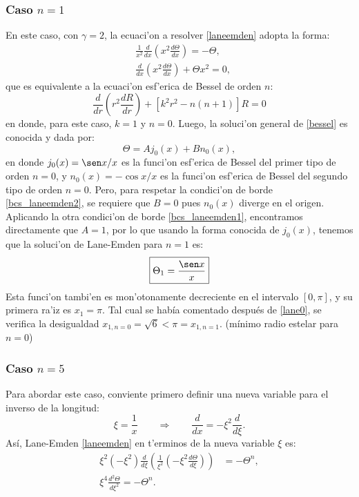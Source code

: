 \subsubsection{Caso \texorpdfstring{$n=1$}{n1}}
En este caso, con $\gamma=2$, la ecuaci'on a resolver \eqref{laneemden} adopta la forma:
\begin{align}
&\frac{1}{x^2}\frac{d}{dx}\left(x^2\frac{d\Theta}{dx}\right)=-\Theta,\\
&\frac{d}{dx}\left(x^2\frac{d\Theta}{dx}\right)+\Theta x^2=0,\label{bessel}
\end{align}
que es equivalente a la ecuaci'on esf'erica de Bessel de orden $n$:
\begin{equation}
 \frac{d}{dr}\left(r^2\frac{dR}{dr}\right)+\left[k^2 r^2-n(n+1)\right]R=0
\end{equation}
en donde, para este caso, $k=1$ y $n=0$. Luego, la soluci'on general de \eqref{bessel} es conocida y dada por:
\begin{equation}
 \Theta=Aj_0(x)+Bn_0(x),
\end{equation}
en donde $j_0(x)=\sen x/x$ es la funci'on esf'erica de Bessel del primer tipo de orden $n=0$, y $n_0(x)=-\cos x/x$ es la funci'on esf'erica de Bessel del segundo tipo de orden $n=0$. Pero, para respetar la condici'on de borde \eqref{bcs_laneemden2}, se requiere que  $B=0$ pues $n_0(x)$ diverge en el origen. Aplicando la otra condici'on de borde \eqref{bcs_laneemden1}, encontramos directamente que $A=1$, por lo que usando la forma conocida de $j_0(x)$, tenemos que la soluci'on de Lane-Emden para $n=1$ es:
\begin{equation}\label{lane1}
 \boxed{\Theta_1=\frac{\sen x}{x}}
\end{equation}
Esta funci'on tambi'en es mon'otonamente decreciente en el intervalo $[0,\pi]$, y su primera ra'iz es $x_1=\pi$. Tal cual se hab\'ia comentado despu\'es de \eqref{lane0}, se verifica la desigualdad $x_{1,n=0}=\sqrt{6}<\pi=x_{1,n=1}.$ (m\'inimo radio estelar para $n=0$)


\subsubsection{Caso \texorpdfstring{$n=5$}{n5}}\label{sec:exactas-n5}
Para abordar este caso, conviente primero definir una nueva variable para el inverso de la longitud:
\begin{equation}\label{lane5cambio}
 \xi=\frac{1}{x}\qquad\Rightarrow\qquad \frac{d}{d x}=-\xi^2\frac{d}{d\xi}.
\end{equation}
As\'i, Lane-Emden \eqref{laneemden} en t'erminos de la nueva variable $\xi$ es:
\begin{align}
\xi^2(-\xi^2)\frac{d}{d\xi}\left(\frac{1}{\xi^2}(-\xi^2\frac{d\Theta}{d\xi})\right)&=-\Theta^n, \\
\xi^4\frac{d^2\Theta}{d\xi^2}=-\Theta^n.\label{transkelvin}
\end{align}

